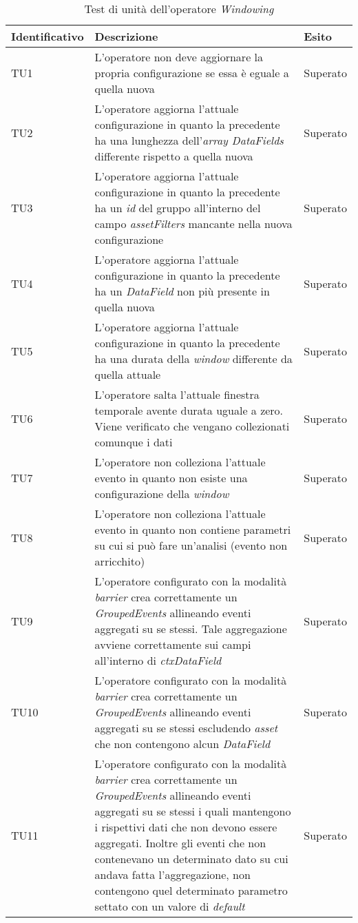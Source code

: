 {
\centering
\begin{longtable}{L{3cm} L{8.5cm} L{2cm}}
\caption{Test di unità dell'operatore \textit{Windowing}}\\
\textbf{Identificativo} &
\textbf{Descrizione}&
\textbf{Esito}\\
\endhead
\hline

TU1 & L'operatore non deve aggiornare la propria configurazione se essa è eguale a quella nuova & Superato \\
\hline
TU2 & L'operatore aggiorna l'attuale configurazione in quanto la precedente ha una lunghezza dell'\textit{array DataFields} differente rispetto a quella nuova & Superato \\
\hline
TU3 & L'operatore aggiorna l'attuale configurazione in quanto la precedente ha un \textit{id} del gruppo all'interno del campo \textit{assetFilters} mancante nella nuova configurazione & Superato\\
\hline
TU4 & L'operatore aggiorna l'attuale configurazione in quanto la precedente ha un \textit{DataField} non più presente in quella nuova & Superato \\
\hline
TU5 & L'operatore aggiorna l'attuale configurazione in quanto la precedente ha una durata della \textit{window} differente da quella attuale & Superato\\
\hline
TU6 & L'operatore salta l'attuale finestra temporale avente durata uguale a zero. Viene verificato che vengano collezionati comunque i dati & Superato \\
\hline
TU7 & L'operatore non colleziona l'attuale evento in quanto non esiste una configurazione della \textit{window} & Superato \\
\hline
TU8 & L'operatore non colleziona l'attuale evento in quanto non contiene parametri su cui si può fare un'analisi (evento non arricchito) & Superato \\
\hline
TU9 & L'operatore configurato con la modalità \textit{barrier} crea correttamente un \textit{GroupedEvents} allineando eventi aggregati su se stessi. Tale aggregazione avviene correttamente sui campi all'interno di \textit{ctxDataField} & Superato \\
\hline
TU10 & L'operatore configurato con la modalità \textit{barrier} crea correttamente un \textit{GroupedEvents} allineando eventi aggregati su se stessi escludendo \textit{asset} che non contengono alcun \textit{DataField} & Superato \\
\hline
TU11 & L'operatore configurato con la modalità \textit{barrier} crea correttamente un \textit{GroupedEvents} allineando eventi aggregati su se stessi i quali mantengono i rispettivi dati che non devono essere aggregati. Inoltre gli eventi che non contenevano un determinato dato su cui andava fatta l'aggregazione, non contengono quel determinato parametro settato con un valore di \textit{default} & Superato \\

\end{longtable}}
